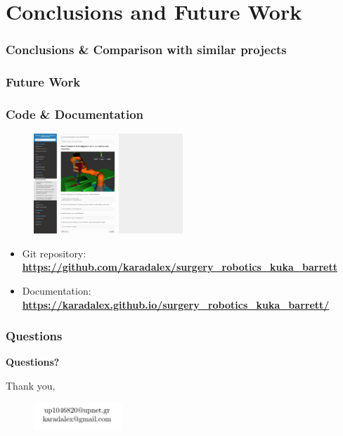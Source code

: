 \section{Conclusions and Future Work}

\begin{frame}
\frametitle{Conclusions \& Comparison with similar projects}
\end{frame}

\begin{frame}
\frametitle{Future Work}
\end{frame}

\begin{frame}
\frametitle{Code \& Documentation}

\begin{center}
\begin{figure}[!htb]
\centering
\includegraphics[width=0.5\textwidth]{../images/documentation.png}
\end{figure}
\end{center}

\begin{itemize}
\item Git repository: \textbf{\url{https://github.com/karadalex/surgery_robotics_kuka_barrett}}
\item Documentation: \textbf{\url{https://karadalex.github.io/surgery_robotics_kuka_barrett/}}
\end{itemize}

\end{frame}


\begin{frame}
\frametitle{Questions}

\begin{center}
\begingroup
    \fontsize{14pt}{20pt}\selectfont
    \textbf{Questions?}\\
\endgroup

\vfill
Thank you,\\

\vfill
\begin{center}
\begin{figure}[!htb]
\centering
\includegraphics[width=0.3\textwidth]{../images/contact-info.png}
\end{figure}
\end{center}
\end{center}
\end{frame}